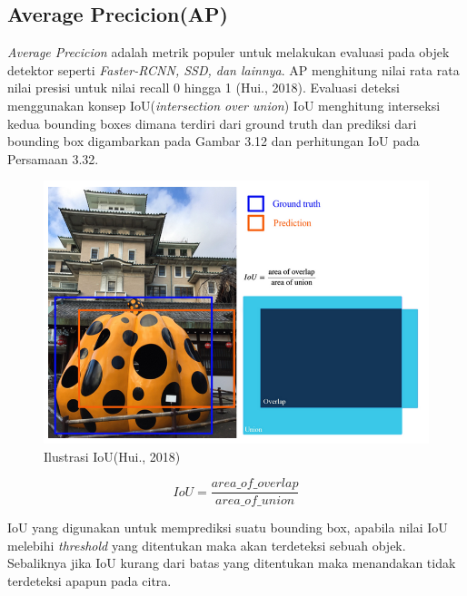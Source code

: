 \subsection{Average Precicion(AP)}
\emph{Average Precicion} adalah metrik populer untuk melakukan evaluasi pada objek detektor seperti \emph{Faster-RCNN, SSD, dan lainnya}. AP menghitung nilai rata rata nilai presisi untuk nilai recall 0 hingga 1 (Hui., 2018). Evaluasi deteksi menggunakan konsep IoU(\emph{intersection over union})
IoU menghitung interseksi kedua bounding boxes dimana terdiri dari ground truth dan prediksi dari bounding box digambarkan pada Gambar 3.12 dan perhitungan IoU pada Persamaan 3.32.
\begin{figure}[H]
	\centering
	\includegraphics[width=0.7\linewidth]{iou}
	\caption{Ilustrasi IoU(Hui., 2018)}
	\label{fig:iou}
\end{figure}
\begin{equation}
	IoU=\frac{area\_of\_overlap}{area\_of\_union}
\end{equation}

IoU yang digunakan untuk memprediksi suatu bounding box, apabila nilai IoU melebihi \emph{threshold} yang ditentukan maka akan terdeteksi sebuah objek.
Sebaliknya jika IoU kurang dari batas yang ditentukan maka menandakan tidak terdeteksi apapun pada citra. 

